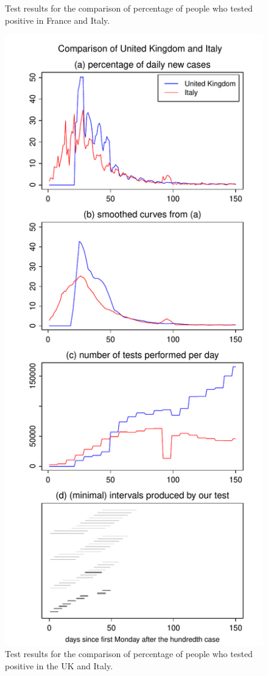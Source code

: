 \documentclass[a4paper,12pt]{article}
\numberwithin{equation}{section}
\begin{document}
\begin{figure}[h!]
\begin{minipage}[t]{0.49\textwidth}
\caption{Test results for the comparison of percentage of people who tested positive in France and Italy.}
\end{minipage}
\hspace{0.25cm}
\begin{minipage}[t]{0.49\textwidth}
\includegraphics[width=\textwidth]{plots/GBR_vs_ITA_normalised}
\caption{Test results for the comparison of percentage of people who tested positive in the UK and Italy.}
\end{minipage}
\end{figure}
\end{document}
